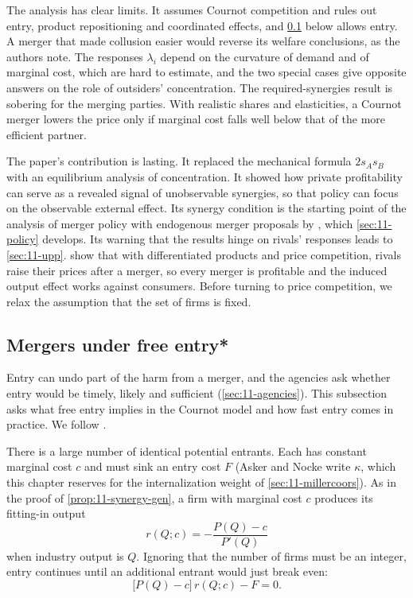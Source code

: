 The analysis has clear limits. It assumes Cournot competition and rules out entry, product repositioning and
coordinated effects, and \cref{sec:11-freeentry} below allows entry. A merger that made collusion easier would
reverse its welfare conclusions, as the authors note. The responses $\lambda_i$ depend on the curvature of demand and of marginal cost, which are hard to estimate,
and the two special cases give opposite answers on the role of outsiders' concentration. The required-synergies
result is sobering for the merging parties. With realistic shares and elasticities, a Cournot merger lowers the
price only if marginal cost falls well below that of the more efficient partner.

The paper's contribution is lasting. It replaced the mechanical formula $2 s_A s_B$ with an equilibrium analysis
of concentration. It showed how private profitability can serve as a revealed signal of unobservable synergies, so
that policy can focus on the observable external effect. Its synergy condition is the starting point of the
analysis of merger policy with endogenous merger proposals by \citet{NockeWhinston2013}, which
\cref{sec:11-policy} develops. Its warning that the results hinge on rivals' responses leads to \cref{sec:11-upp}.
\citet{DeneckereDavidson1985} show that with differentiated products and price competition, rivals raise their
prices after a merger, so every merger is profitable and the induced output effect works against consumers.
Before turning to price competition, we relax the assumption that the set of firms is fixed.

\subsection{Mergers under free entry*}\label{sec:11-freeentry}

Entry can undo part of the harm from a merger, and the agencies ask whether entry would be timely, likely and
sufficient (\cref{sec:11-agencies}). This subsection asks what free entry implies in the Cournot model and how fast
entry comes in practice. We follow \citet[pp.~222--223 and 231--232]{AskerNocke2021}.

There is a large number of identical potential entrants. Each has constant marginal cost $c$ and must sink an entry
cost $F$ (Asker and Nocke write $\kappa$, which this chapter reserves for the internalization weight of
\cref{sec:11-millercoors}). As in the proof of \cref{prop:11-synergy-gen}, a firm with marginal cost $c$ produces its
fitting-in output
\begin{equation*}
r(Q; c) = -\frac{P(Q) - c}{P'(Q)}
\end{equation*}
when industry output is $Q$. Ignoring that the number of firms must be an integer, entry continues until an
additional entrant would just break even:
\begin{equation}\label{eq:11-freeentry}
\big[P(Q) - c\big]\,r(Q; c) - F = 0 .
\end{equation}


